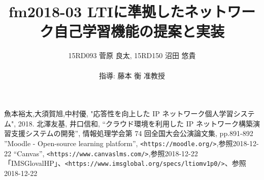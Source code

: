 \documentclass[twocolumn, a4paper]{jsarticle}
\title{ \fontsize{14pt}{0pt}\selectfont fm2018-03 LTIに準拠したネットワーク自己学習機能の提案と実装}
\author{\fontsize{11pt}{0pt}\selectfont 15RD093 菅原 良太, 15RD150 沼田 悠貴\\ \\指導: 藤本 衡 准教授}
\date{}
\begin{document}
\twocolumn[
\pagestyle{normal}
\maketitle]
\thispagestyle{normal}

\fontsize{9pt}{0pt}\selectfont



%







\begin{thebibliography}{5}
   魚本裕太,大須賀旭,中村優, "応答性を向上した
IP ネットワーク個人学習システム", 2018.
   北澤友基, 井口信和, “クラウド環境を利用した IP ネットワーク構築演習支援システムの開発”, 情報処理学会第 74 回全国大会公演論文集, pp.891-892
   ”Moodle - Open-source learning platform”, \texttt{<https://moodle.org/>},参照2018-12-22
   “Canvas”, \texttt{<https://www.canvaslms.com/>},参照2018-12-22
   「IMSGlovalHP」、\texttt{<https://www.imsglobal.org/specs/ltiomv1p0/>}、参照2018-12-22
\end{thebibliography}


\end{document}
